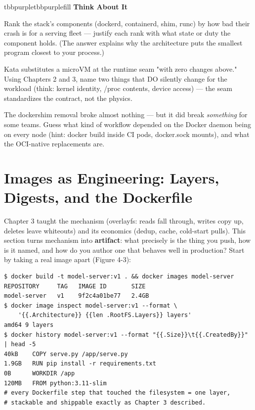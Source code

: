 \begin{calloutbox}{tbbpurple}{tbbpurplefill}
{\normalsize\bfseries\color{tbbpurple}Think About It}\par\vspace{3pt}
\begin{tbbitemize}
  \item Rank the stack's components (dockerd, containerd, shim, runc) by how bad their crash is for a serving fleet — justify each rank with what state or duty the component holds. (The answer explains why the architecture puts the smallest program closest to your process.)
  \item Kata substitutes a microVM at the runtime seam "with zero changes above." Using Chapters 2 and 3, name two things that DO silently change for the workload (think: kernel identity, /proc contents, device access) — the seam standardizes the contract, not the physics.
  \item The dockershim removal broke almost nothing — but it did break \textit{something} for some teams. Guess what kind of workflow depended on the Docker daemon being on every node (hint: docker build inside CI pods, docker.sock mounts), and what the OCI-native replacements are.
\end{tbbitemize}
\end{calloutbox}

\section{Images as Engineering: Layers, Digests, and the Dockerfile}

Chapter 3 taught the mechanism (overlayfs: reads fall through, writes copy up, deletes leave whiteouts) and its economics (dedup, cache, cold-start pulls). This section turns mechanism into \textbf{artifact}: what precisely is the thing you push, how is it named, and how do you author one that behaves well in production? Start by taking a real image apart (Figure 4-3):

\begin{terminalbox}
\begin{Verbatim}[breaklines=true,breakanywhere=true,fontsize=\small,formatcom=\color{tbbtermfg},codes=\tbbcodeactive]
$ docker build -t model-server:v1 . && docker images model-server
REPOSITORY     TAG   IMAGE ID       SIZE
model-server   v1    9f2c4a01be77   2.4GB
$ docker image inspect model-server:v1 --format \
    '{{.Architecture}} {{len .RootFS.Layers}} layers'
amd64 9 layers
$ docker history model-server:v1 --format "{{.Size}}\t{{.CreatedBy}}" | head -5
40kB    COPY serve.py /app/serve.py
1.9GB   RUN pip install -r requirements.txt
0B      WORKDIR /app
120MB   FROM python:3.11-slim
# every Dockerfile step that touched the filesystem = one layer,
# stackable and shippable exactly as Chapter 3 described.
\end{Verbatim}
\end{terminalbox}

